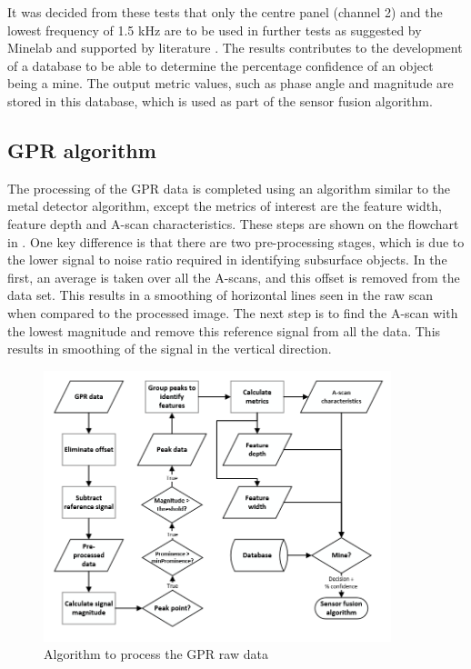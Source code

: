 \documentclass[main.tex]{subfiles}
\begin{document}
It was decided from these tests that only the centre panel (channel 2) and the lowest frequency of 1.5 kHz are to be used in further tests as suggested by Minelab and supported by literature \parencite{bruschini02}. The results contributes to the development of a database to be able to determine the percentage confidence of an object being a mine. The output metric values, such as phase angle and magnitude are stored in this database, which is used as part of the sensor fusion algorithm. 

\subsection{GPR algorithm}
The processing of the GPR data is completed using an algorithm similar to the metal detector algorithm, except the metrics of interest are the feature width, feature depth and A-scan characteristics. These steps are shown on the flowchart in . One key difference is that there are two pre-processing stages, which is due to the lower signal to noise ratio required in identifying subsurface objects.  In the first, an average is taken over all the A-scans, and this offset is removed from the data set. This results in a smoothing of horizontal lines seen in the raw scan when compared to the processed image. The next step is to find the A-scan with the lowest magnitude and remove this reference signal from all the data. This results in smoothing of the signal in the vertical direction.

\begin{figure}[ht]
\includegraphics[width=0.9\textwidth]{4-DetailedDesign/GPRflow.PNG}
\centering
\caption{Algorithm to process the GPR raw data}
\end{figure}
\end{document}
